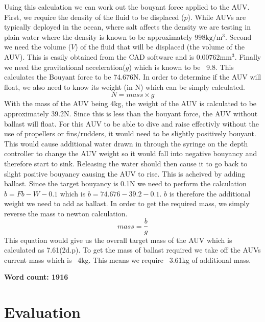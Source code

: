 \documentclass[11pt,a4paper,titlepage]{report}
\begin{document}
	Using this calculation we can work out the bouyant force applied to the AUV. First, we require the density of the fluid to be displaced ($p$). While AUVs are typically deployed in the ocean, where salt affects the density we are testing in plain water where the density is known to be approximately $998\unit{\kilo\gram}/\unit{\meter}^{3}$. Second we need the volume ($V$) of the fluid that will be displaced (the volume of the AUV). This is easily obtained from the CAD software and is $0.00762\unit{\milli\meter}^{3}$. Finally we need the gravitational acceleration($g$) which is known to be ~9.8. This calculates the Bouyant force to be 74.676\unit{\newton}. In order to determine if the AUV will float, we also need to know its weight (in \unit{\newton}) which can be simply calculated. 
	$$
	N = mass \times g
	$$
	With the mass of the AUV being \unit{\approx} 4\unit{\kilo\gram}, the weight of the AUV is calculated to be approximately 39.2\unit{\newton}. Since this is less than the bouyant force, the AUV without ballast will float. For this AUV to be able to dive and raise effectivly without the use of propellers or fins/rudders, it would need to be slightly positively bouyant. This would cause additional water drawn in through the syringe on the depth controller to change the AUV weight so it would fall into negative bouyancy and therefore start to sink. Releasing the water should then cause it to go back to slight positive bouyancy causing the AUV to rise. This is acheived by adding ballast. Since the target bouyancy is 0.1\unit{\newton} we need to perform the calculation $b = Fb - W - 0.1$ which is $b = 74.676 - 39.2 - 0.1$. $b$ is therefore the additional weight we need to add as ballast. In order to get the required mass, we simply reverse the mass to newton calculation. 
	$$
	mass = \frac{b}{g}
	$$
	This equation would give us the overall target mass of the AUV which is calculated as 7.61(2d.p). To get the mass of ballast required we take off the AUVs current mass which is ~4\unit{\kilo\gram}. This means we require ~3.61\unit{\kilo\gram} of additional mass. 
	
	\textbf{Word count: 1916}
	
	
	\chapter*{Evaluation}
	
\end{document}
